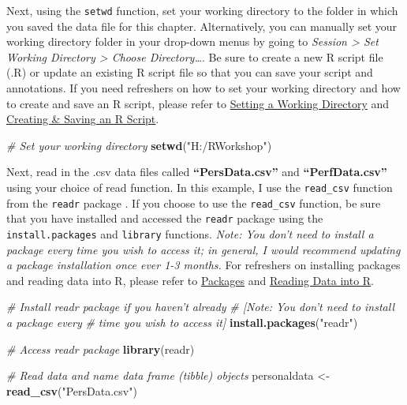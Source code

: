 \documentclass[]{book}
\newenvironment{Shaded}{\begin{snugshade}}{\end{snugshade}}
\newcommand{\KeywordTok}[1]{\textcolor[rgb]{0.13,0.29,0.53}{\textbf{#1}}}
\newcommand{\StringTok}[1]{\textcolor[rgb]{0.31,0.60,0.02}{#1}}
\newcommand{\CommentTok}[1]{\textcolor[rgb]{0.56,0.35,0.01}{\textit{#1}}}
\newcommand{\NormalTok}[1]{#1}
\begin{document}
Next, using the \texttt{setwd} function, set your working directory to
the folder in which you saved the data file for this chapter.
Alternatively, you can manually set your working directory folder in
your drop-down menus by going to \emph{Session \textgreater{} Set
Working Directory \textgreater{} Choose Directory\ldots{}}. Be sure to
create a new R script file (.R) or update an existing R script file so
that you can save your script and annotations. If you need refreshers on
how to set your working directory and how to create and save an R
script, please refer to \protect\hyperlink{setwd}{Setting a Working
Directory} and \protect\hyperlink{createRscript}{Creating \& Saving an R
Script}.

\begin{Shaded}
\begin{Highlighting}[]
\CommentTok{# Set your working directory}
\KeywordTok{setwd}\NormalTok{(}\StringTok{"H:/RWorkshop"}\NormalTok{)}
\end{Highlighting}
\end{Shaded}

Next, read in the .csv data files called \textbf{``PersData.csv''} and
\textbf{``PerfData.csv''} using your choice of read function. In this
example, I use the \texttt{read\_csv} function from the \texttt{readr}
package \citep{R-readr}. If you choose to use the \texttt{read\_csv}
function, be sure that you have installed and accessed the
\texttt{readr} package using the \texttt{install.packages} and
\texttt{library} functions. \emph{Note: You don't need to install a
package every time you wish to access it; in general, I would recommend
updating a package installation once ever 1-3 months.} For refreshers on
installing packages and reading data into R, please refer to
\protect\hyperlink{packages}{Packages} and
\protect\hyperlink{read}{Reading Data into R}.

\begin{Shaded}
\begin{Highlighting}[]
\CommentTok{# Install readr package if you haven't already}
\CommentTok{# [Note: You don't need to install a package every }
\CommentTok{# time you wish to access it]}
\KeywordTok{install.packages}\NormalTok{(}\StringTok{"readr"}\NormalTok{)}
\end{Highlighting}
\end{Shaded}

\begin{Shaded}
\begin{Highlighting}[]
\CommentTok{# Access readr package}
\KeywordTok{library}\NormalTok{(readr)}

\CommentTok{# Read data and name data frame (tibble) objects}
\NormalTok{personaldata <-}\StringTok{ }\KeywordTok{read_csv}\NormalTok{(}\StringTok{"PersData.csv"}\NormalTok{)}
\end{Highlighting}
\end{Shaded}
\end{document}
